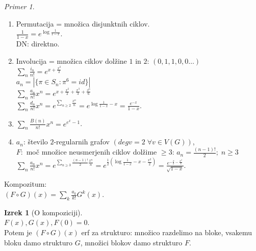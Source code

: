 \documentclass[a4paper, 12pt]{book}
\theoremstyle{definition}
\newtheorem{theorem}[counter]{Izrek}
\theoremstyle{remark}
\newtheorem*{ex}{Primer}
\begin{document}
\begin{ex} \text{} \\
  \begin{enumerate}[label=(\arabic*)]
    \item Permutacija = množica disjunktnih ciklov. \\
      $\frac{1}{1-x} = e^{\log \frac{1}{1-x}}$. \\
      DN: direktno.
    \item Involucija = množica ciklov dolžine $1$ in $2$: $(0,1,1,0,0 \dots)$ \\
      $\sum_{n} \frac{i_n}{n!} = e^{x+\frac{x^2}{2}}$ \\
      $a_n = |\{\pi \in S_n: \pi^6 = id\}|$ \\
      $\sum_n \frac{a_n}{n!} x^n = e^{x + \frac{x^2}{2} + \frac{x^3}{3} + \frac{x^6}{6}}$ \\
      $\sum_n \frac{d_n}{n!} x^n = e^{\sum_{n \geq 2} \frac{x^n}{n}} = e^{\log \frac{1}{1-x} - x} = \frac{e^{-x}}{1-x}$.
    \item $\sum_n \frac{B(n)}{n!} x^n = e^{e^x-1}$.
    \item $a_n$: število $2$-regularnih grafov $(deg v = 2\; \forall v \in V(G))$, \\
      $F:$ moč množice neusmerjenih ciklov dolžime $\geq 3$: $a_n = \frac{(n-1)!}{2}; \; n \geq 3$ \\
      $\sum_n \frac{a_n}{n!} x^n = e^{\sum_{n \geq 3} \frac{(n-1)!}{2} \frac{x^n}{n}} =
        e^{\frac{1}{2} \left(\log \frac{1}{1-x} - x - \frac{x^2}{2}\right)} =
        \frac{e^{-\frac{x}{2} - \frac{x^2}{4}}}{\sqrt{1-x}}$.
  \end{enumerate}
\end{ex}
Kompozitum: \\
$(F \circ G)(x) = \sum_k \frac{a_k}{k!} G^k(x)$.
\begin{theorem}[O kompoziciji] \text{} \\
  $F(x), G(x), F(0) = 0$. \\
  Potem je $(F \circ G)(x)$ erf za strukturo: množico razdelimo na bloke, vsakemu bloku damo strukturo $G$,
  množici blokov damo strukturo $F$.
\end{theorem}
\end{document}
